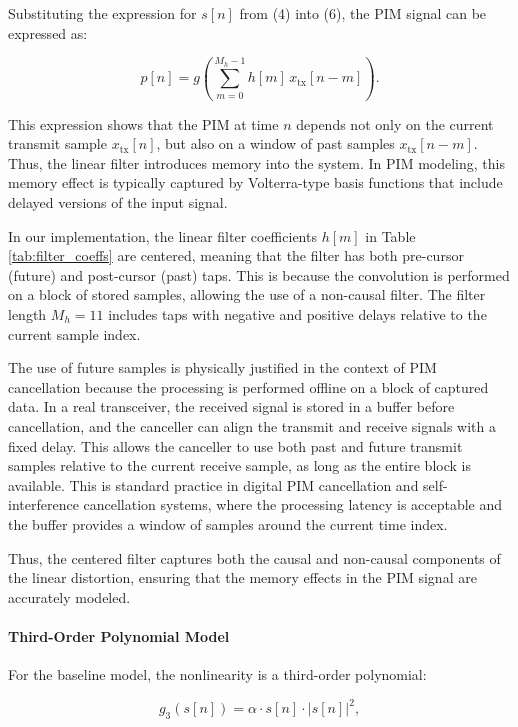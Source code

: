 Substituting the expression for \( s[n] \) from (4) into (6), the PIM signal can be expressed as:

\begin{equation}
p[n] = g\left( \sum_{m=0}^{M_h - 1} h[m] \, x_{\mathrm{tx}}[n - m] \right).
\end{equation}

This expression shows that the PIM at time \( n \) depends not only on the current transmit sample \( x_{\mathrm{tx}}[n] \), but also on a window of past samples \( x_{\mathrm{tx}}[n - m] \). Thus, the linear filter introduces memory into the system. In PIM modeling, this memory effect is typically captured by Volterra-type basis functions that include delayed versions of the input signal.

In our implementation, the linear filter coefficients \( h[m] \) in Table \ref{tab:filter_coeffs} are centered, meaning that the filter has both pre-cursor (future) and post-cursor (past) taps. This is because the convolution is performed on a block of stored samples, allowing the use of a non-causal filter. The filter length \( M_h = 11 \) includes taps with negative and positive delays relative to the current sample index.

The use of future samples is physically justified in the context of PIM cancellation because the processing is performed offline on a block of captured data. In a real transceiver, the received signal is stored in a buffer before cancellation, and the canceller can align the transmit and receive signals with a fixed delay. This allows the canceller to use both past and future transmit samples relative to the current receive sample, as long as the entire block is available. This is standard practice in digital PIM cancellation and self-interference cancellation systems, where the processing latency is acceptable and the buffer provides a window of samples around the current time index.

Thus, the centered filter captures both the causal and non-causal components of the linear distortion, ensuring that the memory effects in the PIM signal are accurately modeled.

\paragraph{Third-Order Polynomial Model}

For the baseline model, the nonlinearity is a third-order polynomial:

\begin{equation}
g_{\mathrm{3}}(s[n]) = \alpha \cdot s[n] \cdot |s[n]|^2,
\end{equation}

